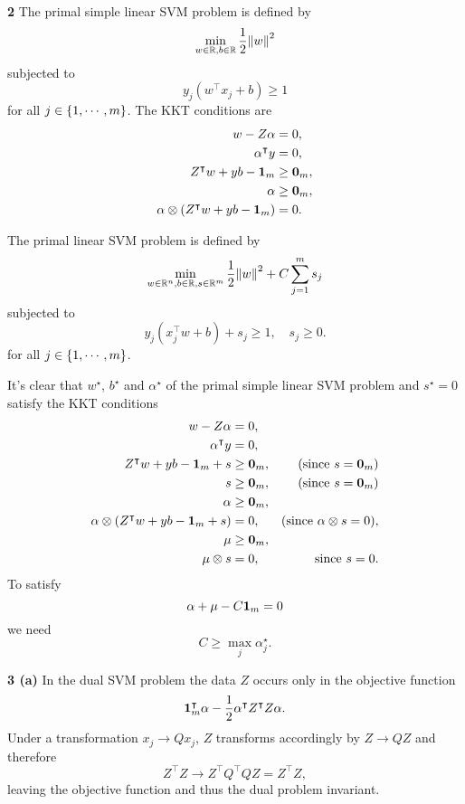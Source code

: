 \documentclass{article}
\makeatletter
\newcommand*{\shifttext}[1]{%
  \settowidth{\@tempdima}{#1}%
  \hspace{-\@tempdima}#1%
}
\newcommand{\plabel}[1]{%
\shifttext{\textbf{#1}\quad}%
}
\newcommand{\prule}{%
\begin{center}%
\hdashrule[0.5ex]{.99\linewidth}{1pt}{1pt 2.5pt}%
\end{center}%
}
\makeatother
\begin{document}
\prule

\plabel{2}%
The primal simple linear SVM problem is defined by
\[ \min_{w\in\mathbb{R},b\in\mathbb{R}} \frac{1}{2} \norm{w}^2 \]
subjected to
\[ y_j (w^\intercal x_j + b) \ge 1 \]
for all $j\in\qty{1,\cdots,m}$.
The KKT conditions are
\begin{align*}
    w - Z\alpha &= 0, \\
    \alpha^\intercal y &= 0, \\
    Z^\intercal w + y b - \vb{1}_m &\ge \vb{0}_m, \\
    \alpha &\ge \vb{0}_m, \\
    \alpha \otimes (Z^\intercal w + y b - \vb{1}_m) &= 0.
\end{align*}
\par
The primal linear SVM problem is defined by
\[ \min_{w\in\mathbb{R}^n,b\in\mathbb{R},s\in\mathbb{R}^m} \frac{1}{2}\norm{w}^2 + C\sum_{j=1}^m s_j \]
subjected to
\[ y_j(x_j^\intercal w + b) + s_j \ge 1,\quad s_j\ge 0. \]
for all $j\in\qty{1,\cdots,m}$.
\par
It's clear that $w^\star$, $b^\star$ and $\alpha^\star$ of the primal simple linear SVM problem and $s^\star = 0$ satisfy the KKT conditions
\begin{align*}
    w - Z\alpha &= 0, \\
    \alpha^\intercal y &= 0, \\
    Z^\intercal w + y b - \vb{1}_m + s &\ge \vb{0}_m, & \text{(since $s = \vb{0}_m$)} \\
    s & \ge \vb{0}_m,  & \text{(since $s = \vb{0}_m$)} \\
    \alpha &\ge \vb{0}_m, \\
    \alpha \otimes (Z^\intercal w + y b - \vb{1}_m + s) &= 0, & \text{(since $\alpha \otimes s = 0$)}, \\
    \mu &\ge \vb{0}_m, \\
    \mu\otimes s &= 0, & \text{since $s = 0$}.
\end{align*}
To satisfy
\[ \alpha + \mu - C \vb{1}_m = 0 \]
we need
\[ C \ge \max_j \alpha^\star_j. \]

\prule

\plabel{3 (a)}%
In the dual SVM problem the data $Z$ occurs only in the objective function
\[ \vb{1}_m^\intercal \alpha - \frac{1}{2} \alpha^\intercal Z^\intercal Z \alpha. \]
Under a transformation $x_j \rightarrow Q x_j$, $Z$ transforms accordingly by $Z \rightarrow Q Z$ and therefore
\[ Z^\intercal Z \rightarrow Z^\intercal Q^\intercal Q Z = Z^\intercal Z, \]
leaving the objective function and thus the dual problem invariant.
\end{document}

